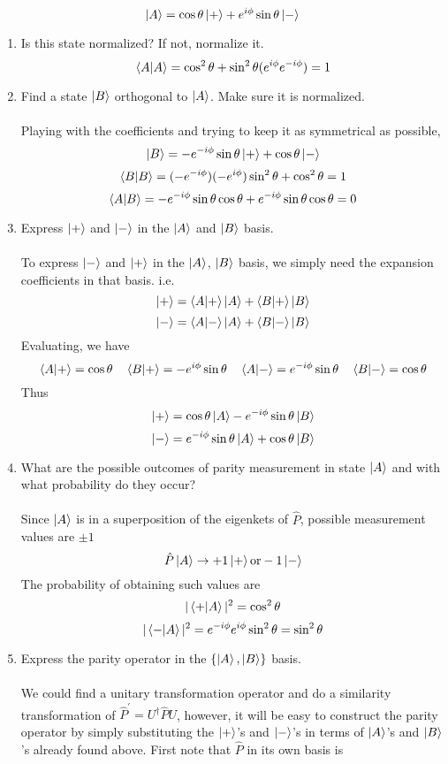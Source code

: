\documentclass[11pt,letterpaper]{article}
\begin{document}
\begin{enumerate}
$$\ket A = \cos\theta\ket + + e^{i\phi}\sin\theta\ket -$$
\begin{enumerate}
\item Is this state normalized? If not, normalize it.
\\ $$\braket{A|A} = \cos^2{\theta}+\sin^2\theta(e^{i\phi}e^{-i\phi})=1$$
\item Find a state $\ket B$ orthogonal to $\ket A$. Make sure it is normalized.
\\ \\Playing with the coefficients and trying to keep it as symmetrical as possible, 
$$\ket B = -e^{-i\phi}\sin\theta\ket + + \cos\theta\ket -$$
$$\braket{B|B} = (-e^{-i\phi})(-e^{i\phi})\sin^2\theta + \cos^2\theta = 1$$
$$\braket{A|B} = -e^{-i\phi}\sin\theta\cos\theta+e^{-i\phi}\sin\theta\cos\theta=0$$
\item Express $\ket +$ and $\ket -$ in the $\ket A$ and $\ket B$ basis.
\\ \\To express $\ket -$ and $\ket +$ in the $\ket A$, $\ket B$ basis, we simply need the expansion coefficients in that basis. i.e.
  $$\ket + = \braket{A|+}\ket A + \braket{B|+}\ket B$$
  $$\ket - = \braket{A|-}\ket A + \braket{B|-}\ket B$$
 Evaluating, we have
 $$\braket{A|+} = \cos\theta \quad \braket{B|+}=-e^{i\phi}\sin\theta\quad \braket{A|-}=e^{-i\phi}\sin\theta\quad \braket{B|-}=\cos\theta$$
 Thus
 $$\ket + = \cos\theta\ket A -e^{-i\phi}\sin\theta\ket B$$
 $$\ket - = e^{-i\phi}\sin\theta\ket A + \cos\theta\ket B$$
\item What are the possible outcomes of parity measurement in state $\ket A$ and with what probability do they occur?
\\ \\Since $\ket A$ is in a superposition of the eigenkets of $\hat P$, possible measurement values are $\pm 1$
$$\hat P\ket A \rightarrow +1\ket + \text{or} -1\ket -$$
The probability of obtaining such values are 
$$|\braket{+|A}|^2 =\cos^2\theta$$ $$|\braket{-|A}|^2=e^{-i\phi}e^{i\phi}\sin^2\theta=\sin^2\theta$$
\item Express the parity operator in the $\{\ket A,\ket B\}$ basis.
\\ \\We could find a unitary transformation operator and do a similarity transformation of $\hat P^\prime = U^\dag \hat PU$, however, it will be easy to construct the parity operator by simply substituting the $\ket +$'s and $\ket -$'s in terms of $\ket A$'s and $\ket B$'s already found above. First note that $\hat P$ in its own basis is

\end{enumerate}
\end{enumerate}
\end{document}

